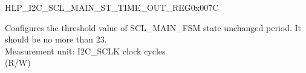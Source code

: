     \begin{register}{H}{LP\_I2C\_SCL\_MAIN\_ST\_TIME\_OUT\_REG}{0x007C}\label{regdesc:LPI2CSCLMAINSTTIMEOUTREG}
    \regnewline%
    \begin{regdesc}\begin{reglist}
    \label{fielddesc:LPI2CSCLMAINSTTOI2C}\item [LP\_I2C\_SCL\_MAIN\_ST\_TO\_I2C] Configures the threshold value of SCL\_MAIN\_FSM state unchanged period. It should be no more than 23.\\
    Measurement unit: I2C\_SCLK clock cycles \\ (R/W)
    \end{reglist}\end{regdesc}
    \end{register}


